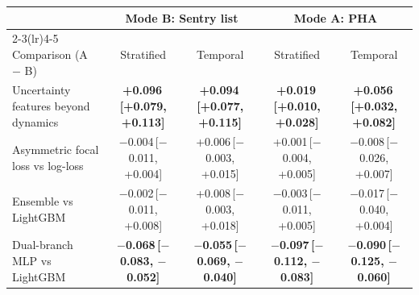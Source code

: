\begin{tabular}{lcccc}
\toprule
 & \multicolumn{2}{c}{Mode B: Sentry list} & \multicolumn{2}{c}{Mode A: PHA}\\
\cmidrule(lr){2-3}\cmidrule(lr){4-5}
Comparison (A $-$ B) & Stratified & Temporal & Stratified & Temporal\\
\midrule
Uncertainty features beyond dynamics & \textbf{+0.096\,{\scriptsize[+0.079, +0.113]}} & \textbf{+0.094\,{\scriptsize[+0.077, +0.115]}} & \textbf{+0.019\,{\scriptsize[+0.010, +0.028]}} & \textbf{+0.056\,{\scriptsize[+0.032, +0.082]}}\\
Asymmetric focal loss vs log-loss & $-$0.004\,{\scriptsize[$-$0.011, +0.004]} & +0.006\,{\scriptsize[$-$0.003, +0.015]} & +0.001\,{\scriptsize[$-$0.004, +0.005]} & $-$0.008\,{\scriptsize[$-$0.026, +0.007]}\\
Ensemble vs LightGBM & $-$0.002\,{\scriptsize[$-$0.011, +0.008]} & +0.008\,{\scriptsize[$-$0.003, +0.018]} & $-$0.003\,{\scriptsize[$-$0.011, +0.005]} & $-$0.017\,{\scriptsize[$-$0.040, +0.004]}\\
Dual-branch MLP vs LightGBM & \textbf{$-$0.068\,{\scriptsize[$-$0.083, $-$0.052]}} & \textbf{$-$0.055\,{\scriptsize[$-$0.069, $-$0.040]}} & \textbf{$-$0.097\,{\scriptsize[$-$0.112, $-$0.083]}} & \textbf{$-$0.090\,{\scriptsize[$-$0.125, $-$0.060]}}\\
\bottomrule
\end{tabular}
